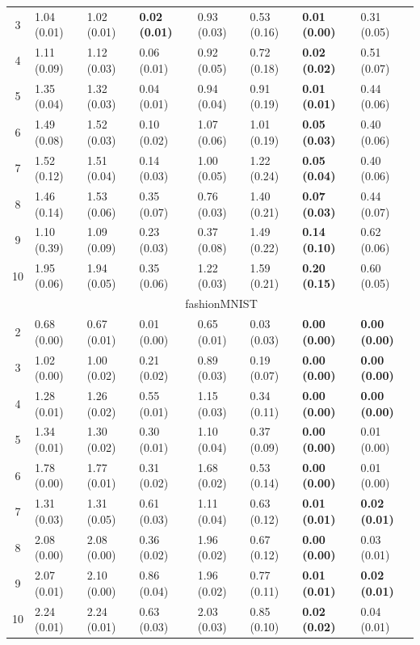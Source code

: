 \begin{table}[t]
\begin{adjustbox}{max width=1.\textwidth}{}
\begin{tabular}{@{}c|lllllll@{}}
3    & 1.04 (0.01) & 1.02 (0.01) & \textbf{0.02 (0.01)} & 0.93 (0.03) & 0.53 (0.16) & \textbf{0.01 (0.00)} & 0.31 (0.05) \\
4    & 1.11 (0.09) & 1.12 (0.03) & 0.06 (0.01)          & 0.92 (0.05) & 0.72 (0.18) & \textbf{0.02 (0.02)} & 0.51 (0.07) \\
5    & 1.35 (0.04) & 1.32 (0.03) & 0.04 (0.01)          & 0.94 (0.04) & 0.91 (0.19) & \textbf{0.01 (0.01)} & 0.44 (0.06) \\
6    & 1.49 (0.08) & 1.52 (0.03) & 0.10 (0.02)          & 1.07 (0.06) & 1.01 (0.19) & \textbf{0.05 (0.03)} & 0.40 (0.06) \\
7    & 1.52 (0.12) & 1.51 (0.04) & 0.14 (0.03)          & 1.00 (0.05) & 1.22 (0.24) & \textbf{0.05 (0.04)} & 0.40 (0.06) \\
8    & 1.46 (0.14) & 1.53 (0.06) & 0.35 (0.07)          & 0.76 (0.03) & 1.40 (0.21) & \textbf{0.07 (0.03)} & 0.44 (0.07) \\
9    & 1.10 (0.39) & 1.09 (0.09) & 0.23 (0.03)          & 0.37 (0.08) & 1.49 (0.22) & \textbf{0.14 (0.10)} & 0.62 (0.06) \\
10   & 1.95 (0.06) & 1.94 (0.05) & 0.35 (0.06)          & 1.22 (0.03) & 1.59 (0.21) & \textbf{0.20 (0.15)} & 0.60 (0.05)
\\ \midrule
& \multicolumn{7}{c}{\multirow{2}{*}{fashionMNIST}}  \\
& \multicolumn{7}{c}{} \\\midrule
2 & 0.68 (0.00) & 0.67 (0.01) & 0.01 (0.00) & 0.65 (0.01) & 0.03 (0.03) & \textbf{0.00 (0.00)} & \textbf{0.00 (0.00)} \\
3 & 1.02 (0.00) & 1.00 (0.02) & 0.21 (0.02) & 0.89 (0.03) & 0.19 (0.07) & \textbf{0.00 (0.00)} & \textbf{0.00 (0.00)} \\
4 & 1.28 (0.01) & 1.26 (0.02) & 0.55 (0.01) & 1.15 (0.03) & 0.34 (0.11) & \textbf{0.00 (0.00)} & \textbf{0.00 (0.00)} \\
5 & 1.34 (0.01) & 1.30 (0.02) & 0.30 (0.01) & 1.10 (0.04) & 0.37 (0.09) & \textbf{0.00 (0.00)} & 0.01 (0.00) \\
6 & 1.78 (0.00) & 1.77 (0.01) & 0.31 (0.02) & 1.68 (0.02) & 0.53 (0.14) & \textbf{0.00 (0.00)} & 0.01 (0.00) \\
7 & 1.31 (0.03) & 1.31 (0.05) & 0.61 (0.03) & 1.11 (0.04) & 0.63 (0.12) & \textbf{0.01 (0.01)} & \textbf{0.02 (0.01)} \\
8 & 2.08 (0.00) & 2.08 (0.00) & 0.36 (0.02) & 1.96 (0.02) & 0.67 (0.12) & \textbf{0.00 (0.00)} & 0.03 (0.01) \\
9 & 2.07 (0.01) & 2.10 (0.00) & 0.86 (0.04) & 1.96 (0.02) & 0.77 (0.11) & \textbf{0.01 (0.01)} & \textbf{0.02 (0.01)} \\
10& 2.24 (0.01) & 2.24 (0.01) & 0.63 (0.03) & 2.03 (0.03) & 0.85 (0.10) & \textbf{0.02 (0.02)} & 0.04 (0.01)
 \\
\bottomrule
\end{tabular}
\end{adjustbox}
\vspace*{\baselineskip}
\end{table}

